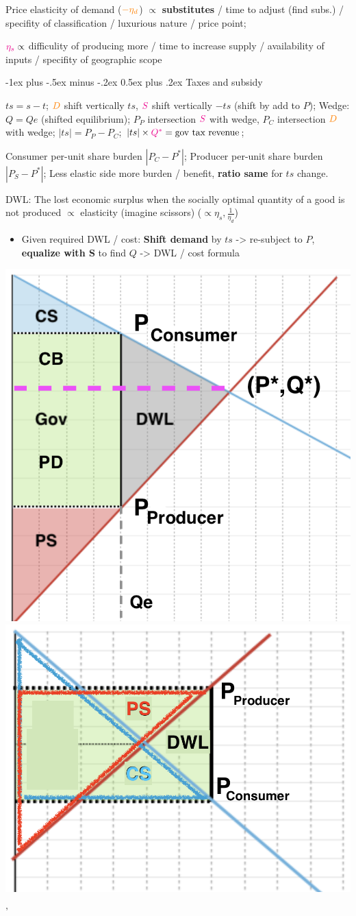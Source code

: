 \documentclass[a4paper]{article}
\makeatletter
\renewcommand{\section}{\@startsection{section}{1}{0mm}%
                                {-1ex plus -.5ex minus -.2ex}%
                                {0.5ex plus .2ex}%
                                {\normalfont\small\bfseries}}
\makeatother
\begin{document}
\begin{multicols*}{3}
        Price elasticity of demand ($\textcolor{orange}{-\eta_d}$) $\propto$ \textbf{substitutes} / time to adjust (find subs.) / specifity of classification / luxurious nature / price point;

    $\textcolor{magenta}{\eta_s}\propto$ difficulity of producing more / time to increase supply / availability of inputs / specifity of geographic scope

        \section{Taxes and subsidy}

    $ts=s-t$; $\textcolor{orange}{D}$ shift vertically $ts$, $\textcolor{magenta}{S}$ shift vertically $-ts$ (shift by add to $P$); Wedge: $Q=Qe$ (shifted equilibrium); $P_P$ intersection $\textcolor{magenta}{S}$ with wedge, $P_C$ intersection $\textcolor{orange}{D}$ with wedge; $|ts|=P_P-P_C$; $|ts|\times \textcolor{magenta}{Q^*}=\text{gov tax revenue}$;

        Consumer per-unit share burden $|P_C-P^*|$; Producer per-unit share burden $|P_S-P^*|$; Less elastic side more burden / benefit, \textbf{ratio same} for $ts$ change.

        DWL: The lost economic surplus when the socially optimal quantity of a good is not produced $\propto$ elasticity (imagine scissors) ($\propto \eta_s, \frac{1}{\eta_d}$)


        \begin{itemize}
            \item Given required DWL / cost: \textbf{Shift demand} by $ts$ -> re-subject to $P$, \textbf{equalize with S} to find $Q$ -> DWL / cost formula
        \end{itemize}
        \begin{minipage}{\linewidth}
            \includegraphics[width=.48\linewidth]{./tax.png}
            \includegraphics[width=.48\linewidth]{./tax2.png}
        \end{minipage}'


\end{multicols*}
\end{document}
